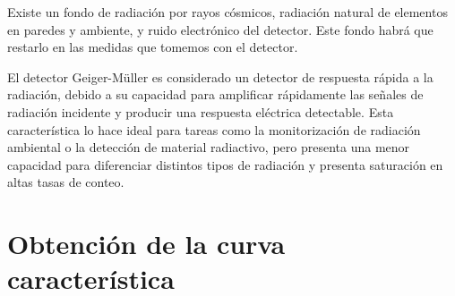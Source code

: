 \documentclass[a4paper,12pt,spanish]{article}
\begin{document}
	Existe un fondo de radiación por rayos cósmicos, radiación natural de elementos en paredes y ambiente, y ruido electrónico del detector. Este fondo habrá que restarlo en las medidas que tomemos con el detector.
	
	El detector Geiger-Müller es considerado un detector de respuesta rápida a la radiación, debido a su capacidad para amplificar rápidamente las señales de radiación incidente y producir una respuesta eléctrica detectable. Esta característica lo hace ideal para tareas como la monitorización de radiación ambiental o la detección de material radiactivo, pero presenta una menor capacidad para diferenciar distintos tipos de radiación y presenta saturación en altas tasas de conteo.
	

	
	
	
	

	\fi
	
	\section{Obtención de la curva característica}
	
\end{document}
